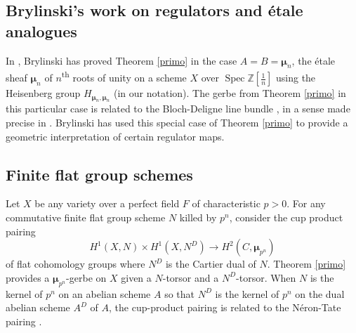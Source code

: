\documentclass{amsart}
\numberwithin{equation}{subsection}
\theoremstyle{remark}
\theoremstyle{remark}
\newcommand{\too}{\longrightarrow}%
\newcommand{\cK}{\mathcal{K}}
\newcommand{\cO}{\mathcal{O}}
\newcommand{\bbZ}{\mathbb{Z}}
\newcommand{\mmu}{\boldsymbol{\mu}} %
\DeclareMathOperator{\Spec}{Spec}
\newcommand{\ts}{\textsuperscript}
\begin{document}
\subsection{Brylinski's work on regulators and \'etale analogues} In \cite{Brylinski}, Brylinski has proved Theorem \ref{primo} in the case $A =B =\mmu_n$, the \'etale sheaf $\mmu_n$ of $n$\ts{th} roots of unity on a scheme $X$ over $\Spec\bbZ[\frac{1}{n}]$ using the Heisenberg group $H_{\mmu_n, \mmu_n}$ (in our notation). %
The gerbe from Theorem \ref{primo} in this particular case is related to the Bloch-Deligne line bundle \cite{Deligne0, Ramakrishnan}, in a sense made precise in \cite[Proposition 5.1 and after]{Brylinski}. Brylinski has used this special case of Theorem \ref{primo} to provide a geometric interpretation of certain regulator maps.


\subsection{Finite flat group schemes} Let $X$ be any variety over a perfect field $F$ of characteristic $p>0$. For any commutative finite flat group scheme $N$ killed by $p^n$, consider the cup product pairing
\begin{equation*}
  H^1(X, N) \times H^1(X, N^D) \to H^2(C, \mmu_{p^n})
\end{equation*}
of flat cohomology groups where $N^D$ is the Cartier dual of $N$. Theorem \ref{primo} provides a $\mmu_{p^n}$-gerbe on $X$ given a $N$-torsor and a $N^D$-torsor.  When $N$ is the kernel of $p^n$ on an abelian scheme $A$ so that $N^D$ is the kernel of $p^n$ on the dual abelian scheme $A^D$ of $A$, the cup-product pairing is related to the N\'eron-Tate pairing \cite[p.~19]{Milne67}.
\end{document}
